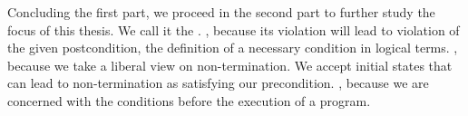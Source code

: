 Concluding the first part, we proceed in the second part to further study the focus of this thesis. 
We call it the . 
, because its violation will lead to violation of the given postcondition, the definition of a necessary condition in logical terms. 
, because we take a liberal view on non-termination. We accept initial states that can lead to non-termination as satisfying our precondition. 
, because we are concerned with the conditions before the execution of a program. 


